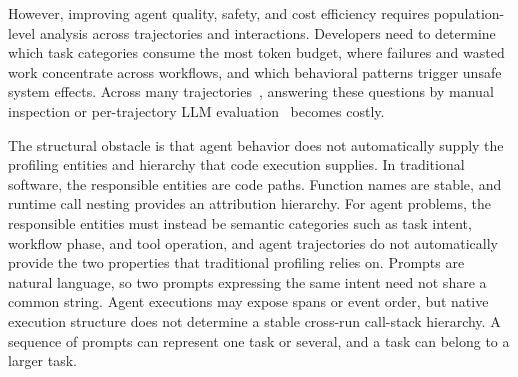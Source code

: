 \documentclass[letterpaper]{article}
\begin{document}
However, improving agent quality, safety, and cost efficiency requires
population-level analysis across trajectories and interactions.
Developers need to determine which task categories consume the most
token budget, where failures and wasted work concentrate across
workflows, and which behavioral patterns trigger unsafe system effects.
Across many trajectories~\cite{agentatlas,agentrewardbench}, answering these
questions by manual inspection or per-trajectory LLM
evaluation~\cite{llm-as-judge} becomes costly.

The structural obstacle is that agent behavior does not automatically
supply the profiling entities and hierarchy that code execution
supplies.
In traditional software, the responsible entities are code paths.
Function names are stable, and runtime call nesting provides an
attribution hierarchy.
For agent problems, the responsible entities must instead be semantic
categories such as task intent, workflow phase, and tool operation, and
agent trajectories do not automatically provide the two properties
that traditional profiling relies on.
Prompts are natural language, so two prompts expressing the same intent
need not share a common string.
Agent executions may expose spans or event order, but native execution
structure does not determine a stable cross-run call-stack hierarchy. A
sequence of prompts can represent one task or several, and a task can belong
to a larger task.
\end{document}
